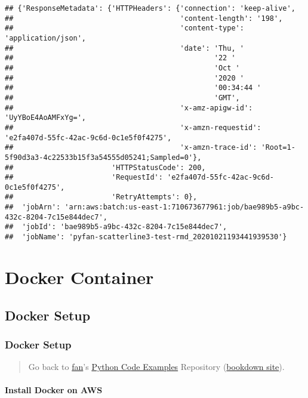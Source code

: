 \documentclass[
]{book}
\begin{document}
\begin{verbatim}
## {'ResponseMetadata': {'HTTPHeaders': {'connection': 'keep-alive',
##                                       'content-length': '198',
##                                       'content-type': 'application/json',
##                                       'date': 'Thu, '
##                                               '22 '
##                                               'Oct '
##                                               '2020 '
##                                               '00:34:44 '
##                                               'GMT',
##                                       'x-amz-apigw-id': 'UyYBoE4AoAMFxYg=',
##                                       'x-amzn-requestid': 'e2fa407d-55fc-42ac-9c6d-0c1e5f0f4275',
##                                       'x-amzn-trace-id': 'Root=1-5f90d3a3-4c22533b15f3a54555d05241;Sampled=0'},
##                       'HTTPStatusCode': 200,
##                       'RequestId': 'e2fa407d-55fc-42ac-9c6d-0c1e5f0f4275',
##                       'RetryAttempts': 0},
##  'jobArn': 'arn:aws:batch:us-east-1:710673677961:job/bae989b5-a9bc-432c-8204-7c15e844dec7',
##  'jobId': 'bae989b5-a9bc-432c-8204-7c15e844dec7',
##  'jobName': 'pyfan-scatterline3-test-rmd_20201021193441939530'}
\end{verbatim}

\hypertarget{docker-container}{%
\chapter{Docker Container}\label{docker-container}}

\hypertarget{docker-setup}{%
\section{Docker Setup}\label{docker-setup}}

\hypertarget{docker-setup-1}{%
\subsection{Docker Setup}\label{docker-setup-1}}

\begin{quote}
Go back to \href{http://fanwangecon.github.io/}{fan}'s \href{https://fanwangecon.github.io/pyfan/}{Python Code Examples} Repository (\href{https://fanwangecon.github.io/pyfan/bookdown}{bookdown site}).
\end{quote}

\hypertarget{install-docker-on-aws}{%
\subsubsection{Install Docker on AWS}\label{install-docker-on-aws}}
\end{document}
